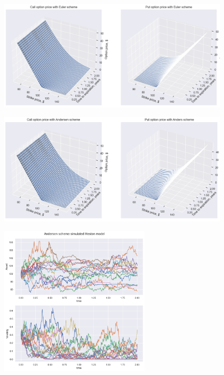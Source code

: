 \subsection{}
    \begin{frame}{}
        \begin{figure}
            \centering
            \includegraphics[width=\textwidth]{assets/euler.png}
        \end{figure}
    \end{frame}

    \begin{frame}{}
        \begin{figure}
            \centering
            \includegraphics[width=\textwidth]{assets/andersen.png}
        \end{figure}
    \end{frame}

    \begin{frame}{}
        \begin{figure}
            \centering
            \includegraphics[width=0.65\textwidth]{assets/andersen_sim.png}
        \end{figure}
    \end{frame}